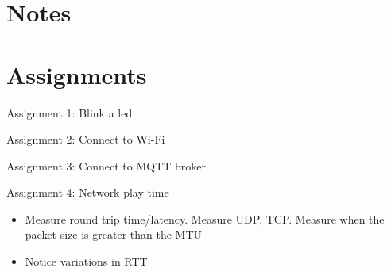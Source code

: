 \hypertarget{notes}{%
\section{Notes}\label{notes}}

\hypertarget{assignments}{%
\section{Assignments}\label{assignments}}

\begin{frame}{Assignment 1: Blink a led}
\protect\hypertarget{assignment-1-blink-a-led}{}

\end{frame}

\begin{frame}{Assignment 2: Connect to Wi-Fi}
\protect\hypertarget{assignment-2-connect-to-wi-fi}{}

\end{frame}

\begin{frame}{Assignment 3: Connect to MQTT broker}
\protect\hypertarget{assignment-3-connect-to-mqtt-broker}{}

\end{frame}

\begin{frame}{Assignment 4: Network play time}
\protect\hypertarget{assignment-4-network-play-time}{}

\begin{itemize}
\item
  Measure round trip time/latency. Measure UDP, TCP. Measure when the
  packet size is greater than the MTU
\item
  Notice variations in RTT
\end{itemize}

\end{frame}
